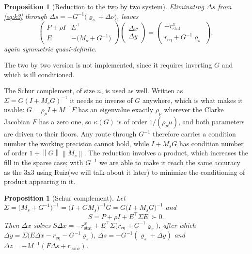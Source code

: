\documentclass[a4paper,11pt]{book}
\theoremstyle{plain}
\newtheorem{proposition}[theorem]{Proposition}
\theoremstyle{definition}
\theoremstyle{remark}
\numberwithin{equation}{chapter}
\numberwithin{algorithm}{chapter}
\newcommand{\norm}[1]{\left\|#1\right\|}
\begin{document}
	
	\begin{proposition}[Reduction to the two by two system]
		Eliminating $\Delta s$ from \eqref{eq:k3} through
		$\Delta s=-G^{-1}\bigl(\varrho_s+\Delta\nu\bigr)$, leaves
		\begin{equation}\label{eq:k2}
			\begin{pmatrix}
				P+\rho I & E^\top\\
				E & -\bigl(M_s+G^{-1}\bigr)
			\end{pmatrix}
			\begin{pmatrix}\Delta x\\ \Delta y\end{pmatrix}
			=\begin{pmatrix}
				-r^{x}_{\mathrm{stat}}\\
				r_{\mathrm{eq}}+G^{-1}\varrho_s
			\end{pmatrix} ,
		\end{equation}
		again symmetric quasi-definite.
	\end{proposition}
	
	
	The two by two version is not implemented, since it requires inverting $G$ and
	which is ill conditioned.
	
	The Schur complement, of size $n$, is used as well. Written as
	$\Sigma=G(I+M_sG)^{-1}$ it needs no inverse of $G$ anywhere, which is what makes
	it usable: $G=\rho_pI+M^{-1}F$ has an eigenvalue exactly $\rho_p$ wherever the
	Clarke Jacobian $F$ has a zero one, so $\kappa(G)$ is of order
	$1/(\rho_p\mu)$, and both parameters are driven to their floors. Any route
	through $G^{-1}$ therefore carries a condition number the working precision
	cannot hold, while $I+M_sG$ has condition number of order
	$1+\norm{G}\norm{M_s}$. The reduction involves a product, which increases the
	fill in the sparse case; with $G^{-1}$ we are able to make it reach the same accuracy as the 3x3 using Ruiz(we will talk about it later) to minimize the conditioning of product appearing in it.
	
	\begin{proposition}[Schur complement]
		Let $\Sigma=\bigl(M_s+G^{-1}\bigr)^{-1}=\bigl(I+GM_s\bigr)^{-1}G
		=G\bigl(I+M_sG\bigr)^{-1}$ and
		\begin{equation}\label{eq:schur}
			S=P+\rho I+E^{\top}\Sigma E\ \succ0 .
		\end{equation}
		Then $\Delta x$ solves
		$S\Delta x=-r^{x}_{\mathrm{stat}}+E^{\top}\Sigma\bigl(r_{\mathrm{eq}}
		+G^{-1}\varrho_s\bigr)$, after which
		$\Delta y=\Sigma\bigl(E\Delta x-r_{\mathrm{eq}}-G^{-1}\varrho_s\bigr)$,
		$\Delta s=-G^{-1}(\varrho_s+\Delta y)$ and
		$\Delta z=-M^{-1}(F\Delta s+r_{\mathrm{cone}})$.
	\end{proposition}
	
\end{document}
